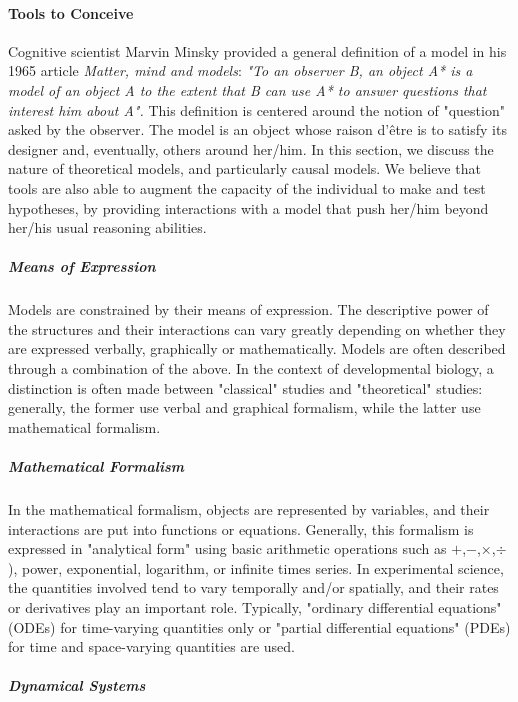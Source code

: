 \paragraph{Tools to Conceive}


Cognitive scientist Marvin Minsky provided a general definition of a model in his 1965 article \textit{Matter, mind and models}\cite{Minsky:1965wb}: \textit{"To an observer B, an object A* is a model of an object A to the extent that B can use A* to answer questions that interest him about A".} This definition is centered around the notion of "question" asked by the observer. The model is an object whose raison d'être is to satisfy its designer and, eventually, others around her/him. In this section, we discuss the nature of theoretical models, and particularly causal models. We believe that tools are also able to augment the capacity of the individual to make and test hypotheses, by providing interactions with a model that push her/him beyond her/his usual reasoning abilities.

\subparagraph{Means of Expression}


Models are constrained by their means of expression. The descriptive power of the structures and their interactions can vary greatly depending on whether they are expressed verbally, graphically or mathematically. Models are often described through a combination of the above. In the context of developmental biology, a distinction is often made between "classical" studies and "theoretical" studies: generally, the former use verbal and graphical formalism, while the latter use mathematical formalism.

\subparagraph{Mathematical Formalism}


In the mathematical formalism, objects are represented by variables, and their interactions are put into functions or equations. Generally, this formalism is expressed in "analytical form" using basic arithmetic operations such as $+$,$-$,$\times$,$\div$), power, exponential, logarithm, or infinite times series. In experimental science, the quantities involved tend to vary temporally and/or spatially, and their rates or derivatives play an important role. Typically, "ordinary differential equations" (ODEs) for time-varying quantities only or "partial differential equations" (PDEs) for time and space-varying quantities are used.

\subparagraph{Dynamical Systems}


